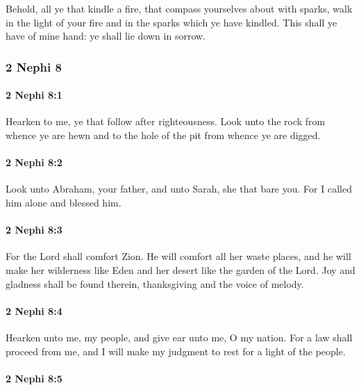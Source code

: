 			Behold, all ye that kindle a fire,
			that compass yourselves about with sparks,
			walk in the light of your fire and in the sparks which ye have kindled.
			This shall ye have of mine hand:
			ye shall lie down in sorrow.

	\subsubsection{2 Nephi 8} %
		\label{2NEPHI-8}
		\paragraph{2 Nephi 8:1} %
			\label{2NEPHI-8-1}

			Hearken to me, ye that follow after righteousness.
			Look unto the rock from whence ye are hewn
			and to the hole of the pit from whence ye are digged.

		\paragraph{2 Nephi 8:2} %
			\label{2NEPHI-8-2}

			Look unto Abraham, your father,
			and unto Sarah, she that bare you.
			For I called him alone and blessed him.

		\paragraph{2 Nephi 8:3} %
			\label{2NEPHI-8-3}

			For the Lord shall comfort Zion.
			He will comfort all her waste places,
			and he will make her wilderness like Eden
			and her desert like the garden of the Lord.
			Joy and gladness shall be found therein,
			thanksgiving and the voice of melody.

		\paragraph{2 Nephi 8:4} %
			\label{2NEPHI-8-4}

			Hearken unto me, my people,
			and give ear unto me, O my nation.
			For a law shall proceed from me,
			and I will make my judgment to rest for a light of the people.

		\paragraph{2 Nephi 8:5} %
			\label{2NEPHI-8-5}

